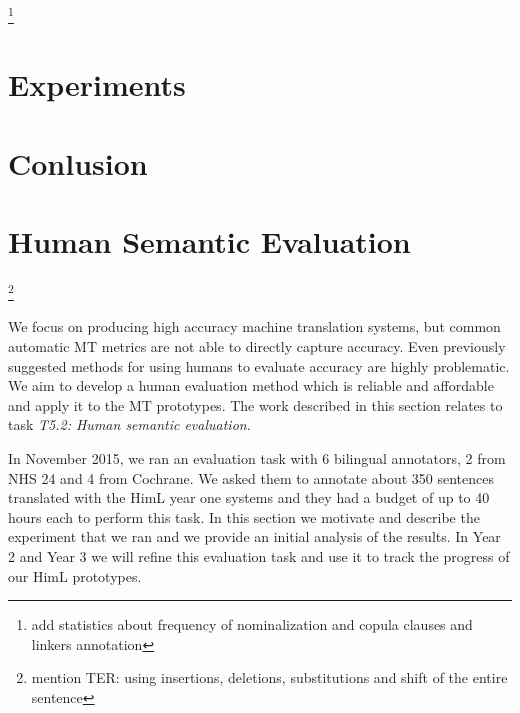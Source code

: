 \documentclass[11pt]{article}
\newcommand{\oa}[1]{\footnote{\color{red} #1}}
\begin{document}
\oa{add statistics about frequency of nominalization and copula clauses and linkers annotation}


\section{Experiments}\label{sec:experiments}








\section{Conlusion}\label{sec:conclusion}










\section{Human Semantic Evaluation}

\oa{mention TER: using insertions, deletions, substitutions and shift of the entire sentence}

\label{sec:sem-eval:human}
We focus on producing high accuracy machine translation systems, but common 
automatic MT metrics are not able to directly capture accuracy. Even previously suggested methods
for using humans to evaluate accuracy are highly problematic. We aim to  develop a human evaluation method 
which is reliable and affordable and apply it to the MT prototypes. 
The
work described
in this section relates to 
task
\emph{T5.2: Human semantic evaluation}.


In November 2015, we ran an evaluation task with 6 bilingual annotators, 2 from NHS 24 and 4 from Cochrane. 
We asked them to annotate about 350 sentences translated with the HimL year one systems 
and they had a budget of  up  to 40 hours each to perform this task. 
In this section we motivate and describe the experiment that we ran and we provide an initial analysis of
the results. In  Year 2 and Year 3 we will refine this evaluation task and use it to track the progress of our HimL prototypes.
\end{document}
